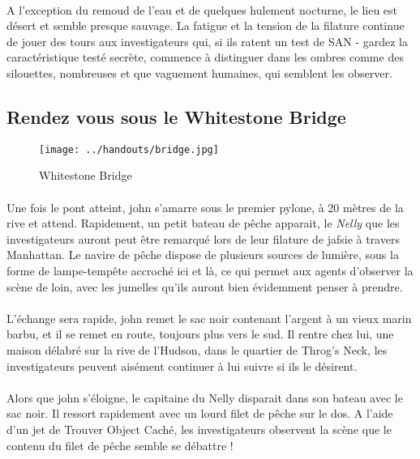 \paragraph{} A l'exception du remoud de l'eau et de quelques hulement nocturne, le lieu est désert et semble presque sauvage. La fatigue et la 
tension de la filature continue de jouer des tours aux investigateurs qui, si ils ratent un test de SAN - gardez la caractéristique testé secrète, commence à
distinguer dans les ombres comme des silouettes, nombreuses et que vaguement humaines, qui semblent les observer.

\subsection{Rendez vous sous le Whitestone Bridge}


\begin{wrapfigure}{r}{65mm}
\begin{center}
 \texttt{[image: ../handouts/bridge.jpg]}
\end{center}
\caption{Whitestone Bridge}
\end{wrapfigure}

\paragraph{} Une fois le pont atteint, \gls{john} s'amarre sous le premier pylone, à 20 mètres de la rive et attend. Rapidement, un petit bateau 
de pêche apparait, le \emph{Nelly} que les investigateurs auront peut être remarqué lors de leur filature de \gls{jafsie} à travers Manhattan. Le
navire de pêche dispose de plusieurs sources de lumière, sous la forme de lampe-tempête accroché ici et là, ce qui permet aux agents d'observer la
scène de loin, avec les jumelles qu'ils auront bien évidemment penser à prendre.

\paragraph{} L'échange sera rapide, \gls{john} remet le sac noir contenant l'argent à un vieux marin barbu, et il se remet en route, toujours plus 
vers le sud. Il rentre chez lui, une maison délabré sur la rive de l'Hudson, dans le quartier de Throg's Neck, les investigateurs peuvent aisément 
continuer à lui suivre si ils le désirent.

\paragraph{} Alors que \gls{john} s'éloigne, le capitaine du Nelly disparait dans son bateau avec le sac noir. Il ressort rapidement avec un lourd
filet de pêche sur le dos. A l'aide d'un jet de Trouver Object Caché, les investigateurs observent la scène que le contenu du filet de pêche semble
se débattre !

